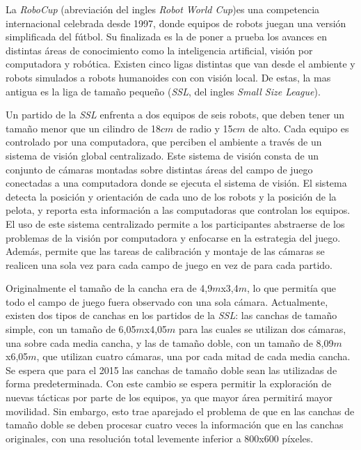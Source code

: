 
La \emph{RoboCup} (abreviación del ingles \emph{Robot World Cup})es una
competencia internacional celebrada desde 1997, donde equipos de robots juegan
una versión simplificada del fútbol. Su finalizada es la de poner a prueba los
avances en distintas áreas de conocimiento como la inteligencia artificial,
visión por computadora y robótica. Existen cinco ligas distintas que van desde
el ambiente y robots simulados a robots humanoides con con visión local. De
estas, la mas antigua es la liga de tamaño pequeño (\emph{SSL}, del ingles
\emph{Small Size League}).

Un partido de la \emph{SSL} enfrenta a dos equipos de seis robots, que deben
tener un tamaño menor que un cilindro de 18$cm$ de radio y 15$cm$ de
alto\cite{sslrules2014}. Cada equipo es controlado por una computadora, que
perciben el ambiente a través de un sistema de visión global centralizado. Este
sistema de visión consta de un conjunto de cámaras montadas sobre distintas
áreas del campo de juego conectadas a una computadora donde se ejecuta el
sistema de visión. El sistema detecta la posición y orientación de cada uno de
los robots y la posición de la pelota, y reporta esta información a las
computadoras que controlan los equipos. El uso de este sistema centralizado
permite a los participantes abstraerse de los problemas de la visión por
computadora y enfocarse en la estrategia del juego. Además, permite que las
tareas de calibración y montaje de las cámaras se realicen una sola vez para
cada campo de juego en vez de para cada partido.

Originalmente el tamaño de la cancha era de 4,9$m$x3,4$m$, lo que permitía que
todo el campo de juego fuera observado con una sola cámara. Actualmente, existen
dos tipos de canchas en los partidos de la \emph{SSL}: las canchas de tamaño
simple, con un tamaño de 6,05$m$x4,05$m$ para las cuales se utilizan dos
cámaras, una sobre cada media cancha, y las de tamaño doble, con un tamaño de
8,09$m$x6,05$m$, que utilizan cuatro cámaras, una por cada mitad de cada media
cancha. Se espera que para el 2015 las canchas de tamaño doble sean las
utilizadas de forma predeterminada. Con este cambio se espera permitir la
exploración de nuevas tácticas por parte de los equipos, ya que mayor área
permitirá mayor movilidad. Sin embargo, esto trae aparejado el problema de que
en las canchas de tamaño doble se deben procesar cuatro veces la información que
en las canchas originales, con una resolución total levemente inferior a 800x600
píxeles.
